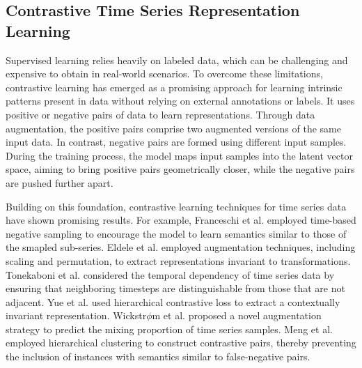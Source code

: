 \subsection{Contrastive Time Series Representation Learning}
 Supervised learning relies heavily on labeled data, which can be challenging and expensive to obtain in real-world scenarios. To overcome these limitations, contrastive learning has emerged as a promising approach for learning intrinsic patterns present in data without relying on external annotations or labels. It uses positive or negative pairs of data to learn representations. Through data augmentation, the positive pairs comprise two augmented versions of the same input data. In contrast, negative pairs are formed using different input samples. During the training process, the model maps input samples into the latent vector space, aiming to bring positive pairs geometrically closer, while the negative pairs are pushed further apart. 
 
Building on this foundation, contrastive learning techniques for time series data have shown promising results. For example, Franceschi et al. \cite{franceschi2019unsupervised} employed time-based negative sampling to encourage the model to learn semantics similar to those of the smapled sub-series. Eldele et al. \cite{tstcc} employed augmentation techniques, including scaling and permutation, to extract representations invariant to transformations. Tonekaboni et al. \cite{tonekaboni2020unsupervised} considered the temporal dependency of time series data by ensuring that neighboring timesteps are distinguishable from those that are not adjacent. Yue et al. \cite{Yue2021TS2VecTU} used hierarchical contrastive loss to extract a contextually invariant representation. Wickstr$\phi$m et al. \cite{wickstrom2022mixing} proposed a novel augmentation strategy to predict the mixing proportion of time series samples. Meng et al. \cite{meng2023mhccl} employed hierarchical clustering to construct contrastive pairs, thereby preventing the inclusion of instances with semantics similar to false-negative pairs.